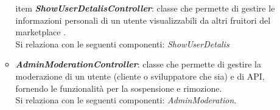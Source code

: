 \begin{itemize}
\begin{itemize}
		item \textbf{\textit{ShowUserDetalisController}}: classe che permette di gestire le informazioni personali di un utente visualizzabili da altri fruitori del marketplace \progetto.\\
		Si relaziona con le seguenti componenti: \textit{ShowUserDetalis}
		
		
		
		\item \textbf{\textit{AdminModerationController}}: classe che permette di gestire la moderazione di un utente (cliente o sviluppatore che sia) e di API, fornendo le funzionalità per la sospensione e rimozione.\\
		Si relaziona con le seguenti componenti: \textit{AdminModeration}.
		
	\end{itemize}
\end{itemize}